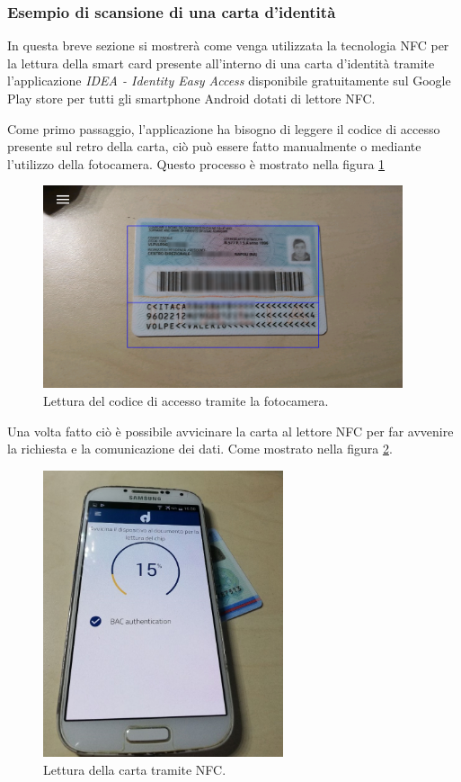 \subsubsection{Esempio di scansione di una carta d'identità}
In questa breve sezione si mostrerà come venga utilizzata la tecnologia NFC per la lettura della smart card presente all'interno di una carta d'identità tramite l'applicazione \textit{IDEA - Identity Easy Access} disponibile gratuitamente sul Google Play store per tutti gli smartphone Android dotati di lettore NFC.

Come primo passaggio, l'applicazione ha bisogno di leggere il codice di accesso presente sul retro della carta, ciò può essere fatto manualmente o mediante l'utilizzo della fotocamera. Questo processo è mostrato nella figura \ref{fig:leggi_codice}

\begin{figure}[h!]
  \centering
  \includegraphics[width=300pt]{pictures/foto_carta.png}
  \caption{Lettura del codice di accesso tramite la fotocamera.}
  \label{fig:leggi_codice}
\end{figure}

Una volta fatto ciò è possibile avvicinare la carta al lettore NFC per far avvenire la richiesta e la comunicazione dei dati. Come mostrato nella figura \ref{fig:leggi_carta}.

\begin{figure}[h!]
  \centering
  \includegraphics[width=200pt]{pictures/lettura_carta.jpg}
  \caption{Lettura della carta tramite NFC.}
  \label{fig:leggi_carta}
\end{figure}

